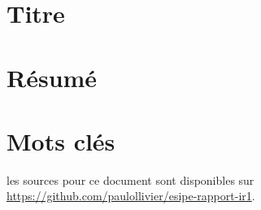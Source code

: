 \begin{titlepage}
\begin{center}
\section*{Titre}
\section*{Résumé}
\section*{Mots clés}

\vfill
les sources pour ce document sont disponibles sur \url{https://github.com/paulollivier/esipe-rapport-ir1}.
\end{center}
\end{titlepage}
